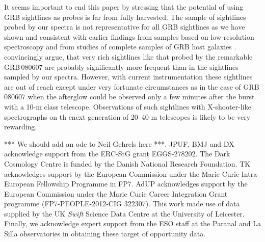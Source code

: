 \documentclass{aa}    %
\begin{document}
It seems important to end this paper by stressing that the potential of 
using GRB sightlines as probes is far from fully harvested. The sample of
sightlines probed by our spectra is not representative for all GRB 
sightlines as we have shown and consistent with earlier findings
from samples based on low-resolution spectroscopy \citep[e.g.,][]{Fynbo2009}
and from studies of complete samples of GRB host galaxies 
\citep{Hjorth2012, Covino2013, Perley2016}. 
\cite{Kruhler2013} convincingly argue, that 
very rich sightlines like that probed by the remarkable GRB\,080607 
\citep{Prochaska2009} are probably significantly more frequent than in the sightlines 
sampled by our spectra. However, with current instrumentation these sightlines are
out of reach except under very fortunate circumstances as in the case of 
GRB\,080607 when the afterglow could be observed only a few minutes after the 
burst with a 10-m class telescope. Observations of such sightlines with 
X-shooter-like spectrographs on th enext generation of 20--40-m telescopes
is likely to be very rewarding. 

\begin{acknowledgements}
	*** We should add an ode to Neil Gehrels here ***.
	JPUF, BMJ and DX acknowledge support from the ERC-StG grant EGGS-278202.  The
	Dark Cosmology Centre is funded by the Danish National Research Foundation.  TK
	acknowledges support by the European Commission under the Marie Curie
	Intra-European Fellowship Programme in FP7.  AdUP acknowledges support by the
	European Commission under the Marie Curie Career Integration Grant programme
	(FP7-PEOPLE-2012-CIG 322307).  This work made use of data supplied by the UK
	{\it Swift} Science Data Centre at the University of Leicester.  Finally, we
	acknowledge expert support from the ESO staff at the Paranal and La Silla
	observatories in obtaining these target of opportunity data.
	
\end{acknowledgements}






\clearpage
\end{document}
